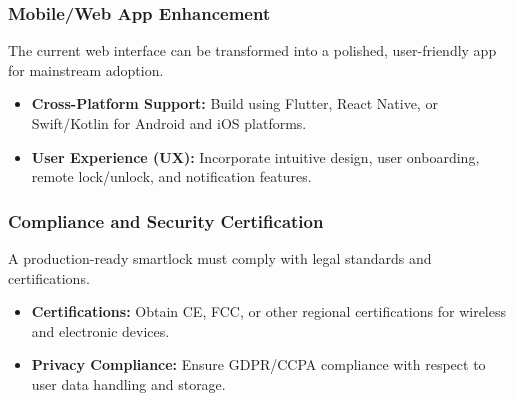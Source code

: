 \subsubsection{Mobile/Web App Enhancement}

The current web interface can be transformed into a polished, user-friendly app for mainstream adoption.

\begin{itemize}
  \item \textbf{Cross-Platform Support:} Build using Flutter, React Native, or Swift/Kotlin for Android and iOS platforms.
  \item \textbf{User Experience (UX):} Incorporate intuitive design, user onboarding, remote lock/unlock, and notification features.
\end{itemize}

\subsubsection{Compliance and Security Certification}

A production-ready smartlock must comply with legal standards and certifications.

\begin{itemize}
  \item \textbf{Certifications:} Obtain CE, FCC, or other regional certifications for wireless and electronic devices.
  \item \textbf{Privacy Compliance:} Ensure GDPR/CCPA compliance with respect to user data handling and storage.
\end{itemize}


